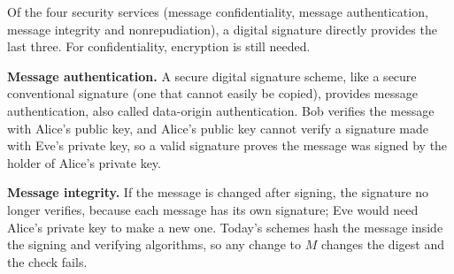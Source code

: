 Of the four security services (message confidentiality, message authentication, message integrity and nonrepudiation), a digital signature directly provides the last three. For confidentiality, encryption is still needed.

\textbf{Message authentication.} A secure digital signature scheme, like a secure conventional signature (one that cannot easily be copied), provides message authentication, also called data-origin authentication. Bob verifies the message with Alice's public key, and Alice's public key cannot verify a signature made with Eve's private key, so a valid signature proves the message was signed by the holder of Alice's private key.

\textbf{Message integrity.} If the message is changed after signing, the signature no longer verifies, because each message has its own signature; Eve would need Alice's private key to make a new one. Today's schemes hash the message inside the signing and verifying algorithms, so any change to $M$ changes the digest and the check fails.

